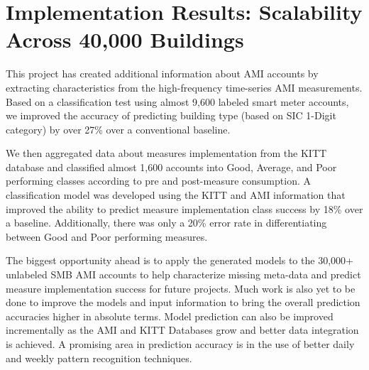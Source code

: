\section{Implementation Results: Scalability Across 40,000 Buildings}
\label{sec:results_measures}

This project has created additional information about AMI accounts by extracting characteristics from the high-frequency time-series AMI measurements. Based on a classification test using almost 9,600 labeled smart meter accounts, we improved the accuracy of predicting building type (based on SIC 1-Digit category) by over 27\% over a conventional baseline. 

We then aggregated data about measures implementation from the KITT database and classified almost 1,600 accounts into Good, Average, and Poor performing classes according to pre and post-measure consumption. A classification model was developed using the KITT and AMI information that improved the ability to predict measure implementation class success by 18\% over a baseline. Additionally, there was only a 20\% error rate in differentiating between Good and Poor performing measures.

The biggest opportunity ahead is to apply the generated models to the 30,000+ unlabeled SMB AMI accounts to help characterize missing meta-data and predict measure implementation success for future projects. Much work is also yet to be done to improve the models and input information to bring the overall prediction accuracies higher in absolute terms. Model prediction can also be improved incrementally as the AMI and KITT Databases grow and better data integration is achieved. A promising area in prediction accuracy is in the use of better daily and weekly pattern recognition techniques.
